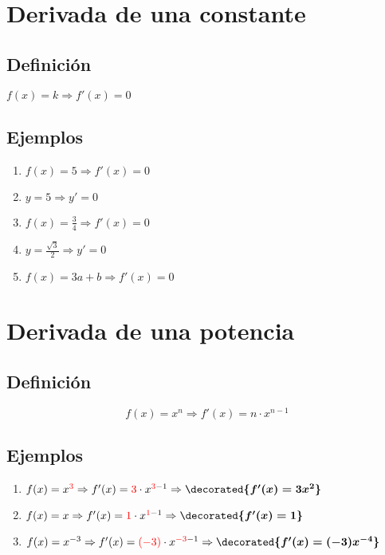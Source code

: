 \documentclass{article}
\newcommand{\tmcolor}[2]{{\color{#1}{#2}}}
\newcommand{\tmmathbf}[1]{\ensuremath{\boldsymbol{#1}}}
\begin{document}
\section{Derivada de una constante}

\subsection{Definici{\'o}n}

$f (x) = k \Rightarrow f' (x) = 0$

\subsection{Ejemplos}

\begin{enumerate}
  \item $f (x) = 5 \Rightarrow f' (x) = 0$
  
  \item $y = 5 \Rightarrow y' = 0$
  
  \item $f (x) = \frac{3}{4} \Rightarrow f' (x) = 0$
  
  \item $y = \frac{\sqrt{3}}{2} \Rightarrow y' = 0$
  
  \item $f (x) = 3 a + b \Rightarrow f' (x) = 0$
\end{enumerate}

\section{Derivada de una potencia}

\subsection{Definici{\'o}n}

\[ f (x) = x^n \Rightarrow f' (x) = n \cdot x^{n - 1} \]

\subsection{Ejemplos}

\begin{enumerate}
  \item $f (x) = x^{\tmcolor{red}{3}} \Rightarrow f' (x) = \tmcolor{red}{3}
  \cdot x^{\tmcolor{red}{3} - 1} \Rightarrow \tmmathbf{\decorated{f' (x) = 3
  x^2}}$
  
  \item $f (x) = x \Rightarrow f' (x) = \tmcolor{red}{1} \cdot
  x^{\tmcolor{red}{1} - 1} \Rightarrow \tmmathbf{\decorated{f' (x) = 1}}$
  
  \item $f (x) = x^{- 3} \Rightarrow f' (x) = \tmcolor{red}{(- 3)} \cdot
  x^{\tmcolor{red}{- 3} - 1} \Rightarrow \tmmathbf{\decorated{f' (x) = (- 3)
  x^{- 4}}}$
\end{enumerate}
\end{document}
